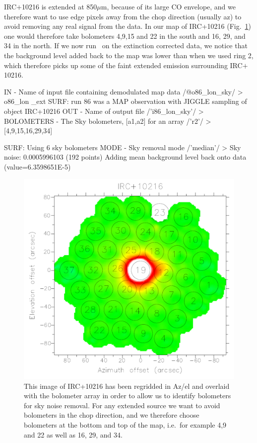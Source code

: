 \documentclass[twoside,11pt,noabs]{starlink}
\providecommand{\task}[1]{\textsf{#1}}
\providecommand{\remsky}{\xref{\task{remsky}}{sun216}{REMSKY}}
\begin{document}
IRC$+$10216 is extended at 850$\mu$m, because of its large CO
envelope, and we therefore want to use edge pixels away from the chop
direction (usually az) to avoid removing any real signal from the
data.  In our map of IRC+10216 (Fig.\ \ref{fig:irc}) one would
therefore take bolometers 4,9,15 and 22 in the south and 16, 29, and
34 in the north.  If we now run \remsky\ on the extinction corrected
data, we notice that the background level added back to the map was
lower than when we used ring 2, which therefore picks up some of the
faint extended emission surrounding IRC$+$10216.

\begin{small}
\begin{terminalv}
IN - Name of input file containing demodulated map data
/@o86_lon_sky/ > o86_lon
_ext
SURF: run 86 was a MAP observation with JIGGLE sampling of object
IRC+10216
OUT - Name of output file /'i86_lon_sky'/ >
BOLOMETERS - The Sky bolometers, [a1,a2] for an array /'r2'/ >
[4,9,15,16,29,34]

SURF: Using 6 sky bolometers
MODE - Sky removal mode /'median'/ >
Sky noise: 0.0005996103 (192 points)
Adding mean background level back onto data (value=6.3598651E-5)
\end{terminalv}
\end{small}

\begin{figure}
\begin{center}
\includegraphics[width=\textwidth]{sc11_fig4}
\caption[Az/el image overlaid with bolometer array.]{This image of IRC+10216 has been regridded in Az/el and
overlaid with the bolometer array in order to allow us to identify
bolometers for sky noise removal. For any extended source we want to
avoid bolometers in the chop direction, and we therefore choose
bolometers at the bottom and top of the map, i.e.\ for example 4,9 and
22 as well as 16, 29, and 34.}
\label{fig:irc}
\end{center}
\end{figure}
\end{document}
